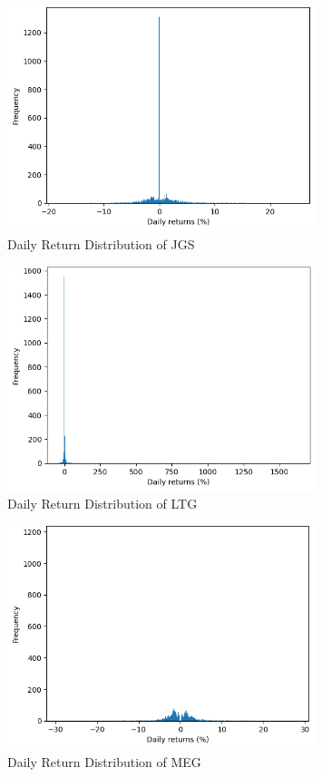 \begin{figure}[ht]
    \centering
    \includegraphics[width=0.80\textwidth]{./assets/Appendices/B/Distribution_DailyReturns/JGS.png}
    \caption{Daily Return Distribution of JGS}
    \label{fig:returndist_JGS}
\end{figure}
\FloatBarrier
    
\begin{figure}[ht]
    \centering
    \includegraphics[width=0.80\textwidth]{./assets/Appendices/B/Distribution_DailyReturns/LTG.png}
    \caption{Daily Return Distribution of LTG}
    \label{fig:returndist_LTG}
\end{figure}
\FloatBarrier

\begin{figure}[ht]
    \centering
    \includegraphics[width=0.80\textwidth]{./assets/Appendices/B/Distribution_DailyReturns/MEG.png}
    \caption{Daily Return Distribution of MEG}
    \label{fig:returndist_MEG}
\end{figure}
\FloatBarrier

